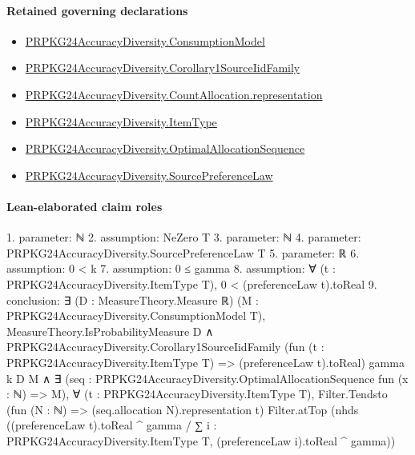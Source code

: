 \documentclass[10pt]{article}
\begin{document}
\paragraph{Retained governing declarations}
\begin{itemize}\raggedright
\item \hyperlink{governing-declaration-ee3d86b30aa41ed7}{PRPKG24\allowbreak{}Accuracy\allowbreak{}Diversity.\allowbreak{}Consumption\allowbreak{}Model}
\item \hyperlink{governing-declaration-6057268f5c200792}{PRPKG24\allowbreak{}Accuracy\allowbreak{}Diversity.\allowbreak{}Corollary1\allowbreak{}Source\allowbreak{}Iid\allowbreak{}Family}
\item \hyperlink{paper-prerequisite-29fb13a9ce74aef5}{PRPKG24\allowbreak{}Accuracy\allowbreak{}Diversity.\allowbreak{}Count\allowbreak{}Allocation.\allowbreak{}representation}
\item \hyperlink{governing-declaration-562ef32e180a12be}{PRPKG24\allowbreak{}Accuracy\allowbreak{}Diversity.\allowbreak{}Item\allowbreak{}Type}
\item \hyperlink{governing-declaration-98821e74d0c4230b}{PRPKG24\allowbreak{}Accuracy\allowbreak{}Diversity.\allowbreak{}Optimal\allowbreak{}Allocation\allowbreak{}Sequence}
\item \hyperlink{governing-declaration-e662f313179ba80f}{PRPKG24\allowbreak{}Accuracy\allowbreak{}Diversity.\allowbreak{}Source\allowbreak{}Preference\allowbreak{}Law}
\end{itemize}
\paragraph{Lean-elaborated claim roles}\begin{ReviewVerbatim}
1. parameter: ℕ
2. assumption: NeZero T
3. parameter: ℕ
4. parameter: PRPKG24AccuracyDiversity.SourcePreferenceLaw T
5. parameter: ℝ
6. assumption: 0 < k
7. assumption: 0 ≤ gamma
8. assumption: ∀ (t : PRPKG24AccuracyDiversity.ItemType T), 0 < (preferenceLaw t).toReal
9. conclusion: ∃ (D : MeasureTheory.Measure ℝ) (M : PRPKG24AccuracyDiversity.ConsumptionModel T),
  MeasureTheory.IsProbabilityMeasure D ∧
    PRPKG24AccuracyDiversity.Corollary1SourceIidFamily
        (fun (t : PRPKG24AccuracyDiversity.ItemType T) => (preferenceLaw t).toReal) gamma k D M ∧
      ∃ (seq : PRPKG24AccuracyDiversity.OptimalAllocationSequence fun (x : ℕ) => M),
        ∀ (t : PRPKG24AccuracyDiversity.ItemType T),
          Filter.Tendsto (fun (N : ℕ) => (seq.allocation N).representation t) Filter.atTop
            (nhds
              ((preferenceLaw t).toReal ^ gamma /
                ∑ i : PRPKG24AccuracyDiversity.ItemType T, (preferenceLaw i).toReal ^ gamma))
\end{ReviewVerbatim}
\end{document}
